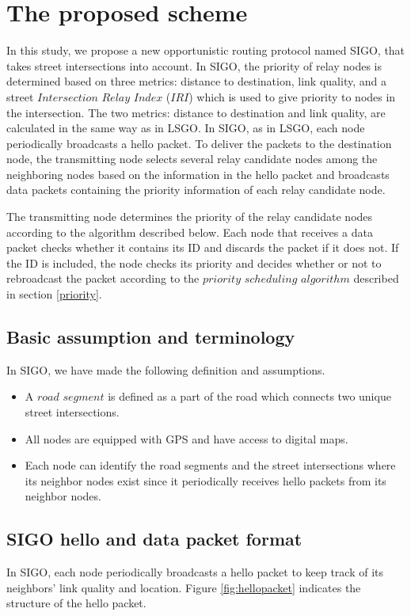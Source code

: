 \documentclass[conference]{IEEEtran}
\begin{document}
\section{The proposed scheme}
\label{SIGO}
In this study, we propose a new opportunistic routing protocol named SIGO, that takes street intersections into account. 
In SIGO, the priority of relay nodes is determined based on three metrics: distance to destination, link quality, and a street $Intersection$ $Relay$ $Index$ ($IRI$) which is used to give priority to nodes in the intersection.
The two metrics: distance to destination and link quality,  are calculated in the same way as in LSGO. 
In SIGO, as in LSGO, each node periodically broadcasts a hello packet. To deliver the packets to the destination node, the transmitting node selects several relay candidate nodes among the neighboring nodes based on the information in the hello packet and broadcasts data packets containing the priority information of each relay candidate node.

The transmitting node determines the priority of the relay candidate nodes according to the algorithm described 
below. Each node that receives a data packet checks whether it contains its ID and discards the packet if it does not. If the ID is included, the node checks its priority and decides whether or not to rebroadcast the packet according to the $priority$ $scheduling$ $algorithm$ described in section \ref{priority}.

\subsection{Basic assumption and terminology}
In SIGO, we have made the following definition and assumptions.
\begin{itemize}
\item A $road$ $segment$ is defined as a part of the road which connects two unique street intersections.
\item All nodes are equipped with GPS and have access to digital maps.
\item Each node can identify the road segments and the street intersections where its neighbor nodes exist since it
periodically receives hello packets from its neighbor nodes.
\end{itemize}


\subsection{SIGO hello and data packet format}
In SIGO, each node periodically broadcasts a hello packet to keep track of its neighbors' link quality and location.  Figure \ref{fig:hellopacket} indicates the structure of the hello packet.
\end{document}
